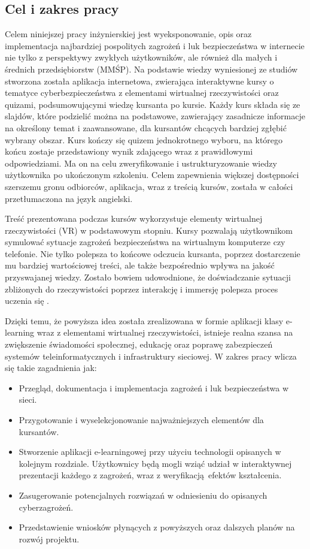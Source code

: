 \documentclass[12pt,twoside]{article}
\begin{document}
\subsection{Cel i zakres pracy}

Celem niniejszej pracy inżynierskiej jest wyeksponowanie, opis oraz implementacja najbardziej pospolitych zagrożeń i luk bezpieczeństwa w internecie nie tylko z perspektywy zwykłych użytkowników, ale również dla małych i średnich przedsiębiorstw (MMŚP). Na podstawie wiedzy wyniesionej ze studiów stworzona została aplikacja internetowa, zwierająca interaktywne kursy o tematyce cyberbezpieczeństwa z elementami wirtualnej rzeczywistości oraz quizami, podsumowującymi wiedzę kursanta po kursie. Każdy kurs składa się ze slajdów, które podzielić można na podstawowe, zawierający zasadnicze informacje na określony temat i zaawansowane, dla kursantów chcących bardziej zgłębić wybrany obszar. Kurs kończy się quizem jednokrotnego wyboru, na którego końcu zostaje przedstawiony wynik zdającego wraz z prawidłowymi odpowiedziami. Ma on na celu zweryfikowanie i ustrukturyzowanie wiedzy użytkownika po ukończonym szkoleniu. Celem zapewnienia większej dostępności szerszemu gronu odbiorców, aplikacja, wraz z treścią kursów, została w całości przetłumaczona na język angielski.

Treść prezentowana podczas kursów wykorzystuje elementy wirtualnej rzeczywistości (VR) w podstawowym stopniu. Kursy pozwalają użytkownikom symulować sytuacje zagrożeń bezpieczeństwa na wirtualnym komputerze czy telefonie. Nie tylko polepsza to końcowe odczucia kursanta, poprzez dostarczenie mu bardziej wartościowej treści, ale także bezpośrednio wpływa na jakość przyswajanej wiedzy. Zostało bowiem udowodnione, że doświadczanie sytuacji zbliżonych do rzeczywistości poprzez interakcję i immersję polepsza proces uczenia się \cite{VrLearning}. 

Dzięki temu, że powyższa idea została zrealizowana w formie aplikacji klasy e-learning wraz z elementami wirtualnej rzeczywistości, istnieje realna szansa na zwiększenie świadomości społecznej, edukację oraz poprawę zabezpieczeń systemów teleinformatycznych i infrastruktury sieciowej. W zakres pracy wlicza się takie zagadnienia jak:
\begin{itemize}
\item Przegląd, dokumentacja i implementacja zagrożeń i luk bezpieczeństwa w sieci. 
\item Przygotowanie i wyselekcjonowanie najważniejszych elementów dla kursantów.
\item Stworzenie aplikacji e-learningowej przy użyciu technologii opisanych w kolejnym rozdziale. Użytkownicy będą mogli wziąć udział w interaktywnej prezentacji każdego z zagrożeń, wraz z weryfikacją efektów kształcenia.
\item Zasugerowanie potencjalnych rozwiązań w odniesieniu do opisanych cyberzagrożeń.
\item Przedstawienie wniosków płynących z powyższych oraz dalszych planów na rozwój projektu.\\
\end{itemize} 
\end{document}
